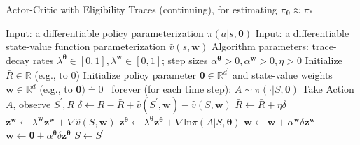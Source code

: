 \documentclass[12pt,a4paper]{article}
\begin{document}
\begin{algorithm}
	\caption{Actor-Critic with Eligibility Traces (continuing), for estimating $\pi_{\bm{\theta}} \approx \pi_{*}$}
	\begin{algorithmic}                                                                                                   
		\State Input: a differentiable policy parameterization $\pi(a|s, \bm{\theta})$
		\State Input: a differentiable state-value function parameterization $\hat{v}(s, \mathbf{w})$
		\State Algorithm parameters: trace-decay rates $\lambda^{\bm{\theta}} \in [0, 1], \lambda^{\mathbf{w}} \in [0,1]$; step sizes $\alpha^{\bm{\theta}} > 0, \alpha^{\mathbf{w}} > 0, \eta > 0$
		\State Initialize $\bar{R} \in \mathbb{R}$ (e.g., to 0)
		\State Initialize policy parameter $\bm{\theta} \in \mathbb{R}^{d^{'}}$ and state-value weights $\mathbf{w} \in \mathbb{R}^{d}$ (e.g., to $\mathbf{0}) \doteq 0$
		\State
		\Loop\ forever (for each time step):
			\State $A \sim \pi(\cdot|S, \bm{\theta})$
			\State Take Action $A$, observe $S^{'}, R$
			\State $\delta \leftarrow R - \bar{R} + \hat{v}(S^{'}, \mathbf{w}) - \hat{v}(S, \mathbf{w})$
			\State $\bar{R} \leftarrow \bar{R} + \eta\delta$
			\State $\mathbf{z}^{\mathbf{w}} \leftarrow \lambda^{\mathbf{w}}\mathbf{z}^{\mathbf{w}} + \nabla\hat{v}(S, \mathbf{w})$
			\State $\mathbf{z}^{\bm{\theta}} \leftarrow \lambda^{\bm{\theta}}\mathbf{z}^{\bm{\theta}} + \nabla \text{ln}\pi(A|S, \bm{\theta})$
			\State $\mathbf{w} \leftarrow \mathbf{w} + \alpha^{\mathbf{w}}\delta\mathbf{z}^{\mathbf{w}}$
			\State $\mathbf{w} \leftarrow \bm{\theta} + \alpha^{\bm{\theta}}\delta\mathbf{z}^{\bm{\theta}}$
			\State $S \leftarrow S^{'}$
		\EndLoop
	\end{algorithmic}
\end{algorithm} 
\end{document}
